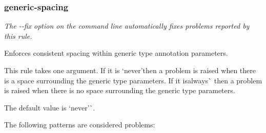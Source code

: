 \label{_eslint-plugin-flowtype-rules-generic-spacing}%
 \subsubsection*{{\ttfamily generic-\/spacing}}

{\itshape The {\ttfamily -\/-\/fix} option on the command line automatically fixes problems reported by this rule.}

Enforces consistent spacing within generic type annotation parameters.

This rule takes one argument. If it is `\textquotesingle{}never'{\ttfamily then a problem is raised when there is a space surrounding the generic type parameters. If it is}\textquotesingle{}always\textquotesingle{}\`{} then a problem is raised when there is no space surrounding the generic type parameters.

The default value is `\textquotesingle{}never'\`{}.

The following patterns are considered problems\+:


